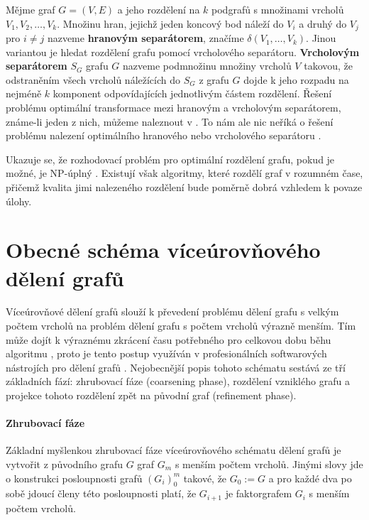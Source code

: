 \documentclass{ctuthesis}
\theoremstyle{plain}
\theoremstyle{definition}
\begin{document}
Mějme graf $G=(V,E)$ a jeho rozdělení na $k$ podgrafů s množinami vrcholů $V_1, V_2, \ldots, V_k$. Množinu hran, jejichž jeden koncový bod náleží do $V_i$ a druhý do $V_j$ pro $i \neq j$ nazveme \textbf{hranovým separátorem}, značíme $\delta(V_1,\ldots,V_k)$. Jinou variantou je hledat rozdělení grafu pomocí vrcholového separátoru.
\textbf{Vrcholovým separátorem} $S_G$ grafu $G$ nazveme podmnožinu množiny vrcholů $V$ takovou, že odstraněním všech vrcholů náležících do $S_G$ z grafu $G$ dojde k jeho rozpadu na nejméně $k$ komponent odpovídajících jednotlivým částem rozdělení. Řešení problému optimální transformace mezi hranovým a vrcholovým separátorem, známe-li jeden z nich, můžeme naleznout v \cite{pofa:90}. To nám ale nic neříká o řešení problému nalezení optimálního hranového nebo vrcholového separátoru \cite{liu:89}.

Ukazuje se, že rozhodovací problém pro optimální rozdělení grafu, pokud je možné, je NP-úplný \cite{gajo:79}. Existují však algoritmy, které rozdělí graf v rozumném čase, přičemž kvalita jimi nalezeného rozdělení bude poměrně dobrá \cite{lita:79} vzhledem k povaze úlohy.

\section{Obecné schéma víceúrovňového dělení grafů}
\label{multilevel}

Víceúrovňové dělení grafů slouží k převedení problému dělení grafu s velkým počtem vrcholů na problém dělení grafu s počtem vrcholů výrazně menším. Tím může dojít k výraznému zkrácení času potřebného pro celkovou dobu běhu algoritmu \cite{kaku:98}, proto je tento postup využíván v profesionálních softwarových nástrojích pro dělení grafů \cite{lehe:95, hele:95}. Nejobecnější popis tohoto schématu sestává ze tří základních fází: zhrubovací fáze (coarsening phase), rozdělení vzniklého grafu a projekce tohoto rozdělení zpět na původní graf (refinement phase).

\paragraph{Zhrubovací fáze}
Základní myšlenkou zhrubovací fáze víceúrovňového schématu dělení grafů je vytvořit z původního grafu $G$ graf $G_m$ s menším počtem vrcholů. Jinými slovy jde o konstrukci posloupnosti grafů $(G_i)_0^m$ takové, že $G_0 := G$ a pro každé dva po sobě jdoucí členy této posloupnosti platí, že $G_{i+1}$ je faktorgrafem $G_i$ s menším počtem vrcholů. 
\end{document}

